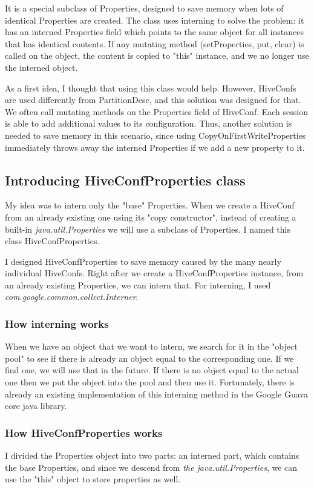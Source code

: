 It is a special subclass of Properties, designed to save memory when lots of identical Properties are created. The class uses interning to solve the problem: it has an interned Properties field which points to the same object for all instances that has identical contents. If any mutating method (\eg setProperties, put, clear) is called on the object, the content is copied to "this" instance, and we no longer use the interned object. 

As a first idea, I thought that using this class would help. However, HiveConfs are used differently from PartitionDesc, and this solution was designed for that. We often call mutating methods on the Properties field of HiveConf. Each session is able to add additional values to its configuration. Thus, another solution is needed to save memory in this scenario, since using CopyOnFirstWriteProperties immediately throws away the interned Properties if we add a new property to it.

\subsection{Introducing HiveConfProperties class}
My idea was to intern only the "base" Properties. When we create a HiveConf from an already existing one using its "copy constructor", instead of creating a built-in \textit{java.util.Properties} we will use a subclass of Properties. I named this class HiveConfProperties. 

I designed HiveConfProperties to save memory caused by the many nearly individual HiveConfs. Right after we create a HiveConfProperties instance, from an already existing Properties, we can intern that. For interning, I used \textit{com.google.common.collect.Interner}. 

\subsubsection{How interning works} 
 When we have an object that we want to intern, we search for it in the "object pool" to see if there is already an object equal to the corresponding one. If we find one, we will use that in the future. If there is no object equal to the actual one then we put the object into the pool and then use it. Fortunately, there is already an existing implementation of this interning method in the Google Guava core java library.
 
 \subsubsection{How HiveConfProperties works}
 I divided the Properties object into two parts: an interned part, which contains the base Properties, and since we descend from \textit{the java.util.Properties}, we can use the "this" object to store properties as well.
 

